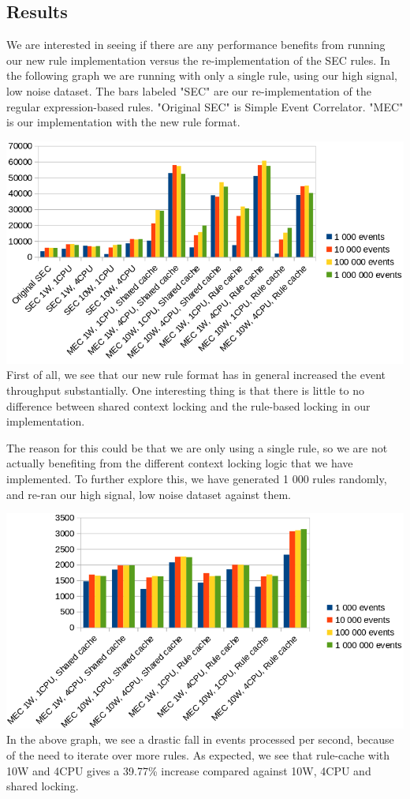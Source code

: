 \subsection{Results}
We are interested in seeing if there are any performance benefits from running our new rule implementation versus the re-implementation of the SEC rules. In the following graph we are running with only a single rule, using our high signal, low noise dataset. The bars labeled "SEC" are our re-implementation of the regular expression-based rules. "Original SEC" is Simple Event Correlator. "MEC" is our implementation with the new rule format.

\includegraphics[scale=0.525]{figures/new-rule-format/performance.png}
\\
First of all, we see that our new rule format has in general increased the event throughput substantially. One interesting thing is that there is little to no difference between shared context locking and the rule-based locking in our implementation.


The reason for this could be that we are only using a single rule, so we are not actually benefiting from the different context locking logic that we have implemented. To further explore this, we have generated 1 000 rules randomly, and re-ran our high signal, low noise dataset against them.

\includegraphics[scale=0.525]{figures/new-rule-format/performance-2.png}
\\
In the above graph, we see a drastic fall in events processed per second, because of the need to iterate over more rules. As expected, we see that rule-cache with 10W and 4CPU gives a 39.77\% increase compared against 10W, 4CPU and shared locking.

